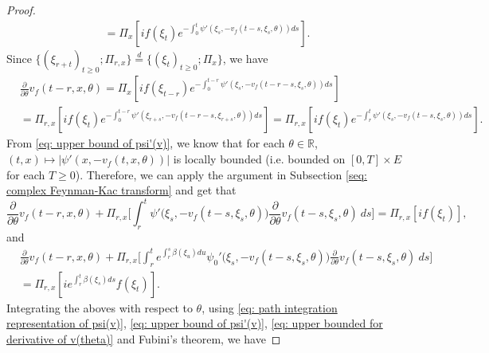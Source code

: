 \documentclass[12pt, a4paper]{amsart}
\theoremstyle{definition}
\numberwithin{equation}{section}
\begin{document}
\begin{proof}
\begin{align}
    = \Pi_x[ if(\xi_t) e^{ - \int_0^t \psi'(\xi_s, -v_f(t-s,\xi_s,\theta)) ds} ].
\end{align}
	Since $\{(\xi_{r+t})_{t \geq 0}; \Pi_{r,x}\} \overset{d}{=} \{(\xi_{t})_{t\geq 0}; \Pi_{x}\} $, we have
\begin{align}
	&\frac{\partial}{\partial \theta} v_f(t - r, x, \theta)
    = \Pi_x[ if(\xi_{t-r}) e^{-\int_0^{t-r} \psi'(\xi_s, -v_f(t-r-s,\xi_s,\theta)) ds} ]
    \\&= \Pi_{r,x}[if(\xi_t)e^{-\int_0^{t-r} \psi'(\xi_{r+s}, -v_f(t-r-s,\xi_{r+s},\theta)) ds} ]
    = \Pi_{r,x}[if(\xi_t)e^{-\int_r^t \psi'(\xi_{s}, -v_f(t-s,\xi_{s},\theta)) ds} ].
\end{align}
    From \eqref{eq: upper bound of psi'(v)}, we know that for each $\theta\in \mathbb R$, $(t,x) \mapsto |\psi'(x,-v_f(t,x,\theta))|$ is locally bounded (i.e. bounded on $[0,T]\times E$ for each $T \geq 0$).
	Therefore, we can apply the argument in Subsection \ref{seq: complex Feynman-Kac transform} and get that
\begin{equation}
    \frac{\partial}{\partial \theta} v_f(t-r, x, \theta) + \Pi_{r,x} \Big[\int_r^t \psi'\big(\xi_s,- v_f(t-s,\xi_s,\theta)\big)\frac{\partial}{\partial \theta} v_f(t-s, \xi_s, \theta)~ds\Big]
	= \Pi_{r,x} [i f(\xi_t)],
\end{equation}
    and
\begin{align}
    &\frac{\partial}{\partial \theta} v_f(t-r, x, \theta) + \Pi_{r,x} \Big[\int_r^t e^{\int_r^s \beta(\xi_u)du}\psi_0'\big(\xi_s,- v_f(t-s,\xi_s,\theta)\big)\frac{\partial}{\partial \theta} v_f(t-s, \xi_s, \theta)~ds\Big]
    \\&= \Pi_{r,x} [i e^{\int_r^t \beta(\xi_s)ds}f(\xi_t)].
\end{align}
	Integrating the aboves with respect to $\theta$, using \eqref{eq: path integration representation of psi(v)}, \eqref{eq: upper bound of psi'(v)}, \eqref{eq: upper bounded for derivative of v(theta)} and Fubini's theorem, we have

\end{proof}
\end{document}
